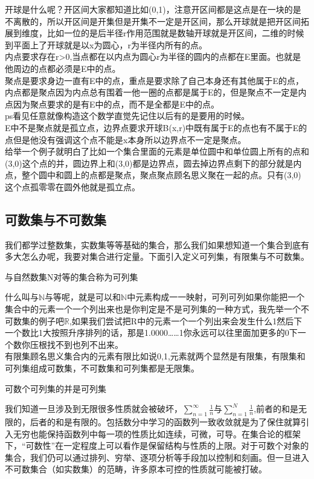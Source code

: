 \documentclass[lang=cn,10pt]{elegantbook}
\begin{document}
\begin{remark}
    开球是什么呢？开区间大家都知道比如(0,1)，注意开区间都是这点是在一块的是不离散的，所以开区间是开集但是开集不一定是开区间，那么开球就是把开区间拓展到维度，比如一位的是后半径r作用范围就是数轴开球就是开区间，二维的时候到平面上了开球就是以x为圆心，r为半径内所有的点。\\内点要求存在r>0,当点都在以内点为圆心r为半径的圆内的点都在E里面。也就是他周边的点都必须是E中的点。\\聚点是要求身边一直有E中的点，重点是要求除了自己本身还有其他属于E的点，内点都是聚点因为内点总有围着一他一圈的点都是属于E的，但是聚点不一定是内点因为聚点要求的是有E中的点，而不是全都是E中的点。\\ps看见任意就像构造这个数学直觉先记住以后有的是要用的时候。\\E中不是聚点就是孤立点，边界点要求开球B(x,r)中既有属于E的点也有不属于E的点但是他没有强调这个点不能是x本身所以边界点不一定是聚点。\\给举一个例子就明白了比如一个集合里面的元素是单位圆中和单位圆上所有的点和(3,0)这个点的并，圆边界上和(3,0)都是边界点，圆去掉边界点剩下的部分就是内点，整个圆中和圆上的点都是聚点，聚点聚点顾名思义聚在一起的点。只有(3,0)这个点孤零零在圆外他就是孤立点。
\end{remark}

\subsection{可数集与不可数集}
我们都学过整数集，实数集等等基础的集合，那么我们如果想知道一个集合到底有多大怎么办呢，我要对集合进行定量。下面引入定义可列集，有限集与不可数集。
\begin{definition}
    与自然数集N对等的集合称为可列集
\end{definition}
什么叫与$\mathbb{N}$与等呢，就是可以和$\mathbb{N}$中元素构成一一映射，可列可列如果你能把一个集合中的元素一个一个列出来也是你判定是不是可列集的一种方式，我先举一个不可数集的例子吧$\mathbb{R}$,如果我们尝试把R中的元素一个一个列出来会发生什么1然后下一个数比1大按照升序排列的话，那是1.0000……1你永远可以往里面加更多的0下一个数你压根找不到也列不出来。\\
有限集顾名思义集合内的元素有限比如说{0,1},元素就两个显然是有限集，有限集和可列集组成可数集，不可数集和可列集都是无限集。
\begin{theorem}
    可数个可列集的并是可列集
\end{theorem}
我们知道一旦涉及到无限很多性质就会被破坏，$\sum_{n=1}^{\infty}\frac{1}{n}$与$
  \sum_{n=1}^{N} \frac{1}{n}$,前者的和是无限的，后者的和是有限的。包括数分中学习的函数列一致收敛就是为了保住就算引入无穷也能保持函数列中每一项的性质比如连续，可微，可导。在集合论的框架下，“可数性”在一定程度上可以看作是保留结构与性质的上限。对于可数个对象的集合，我们仍可以通过排列、穷举、逐项分析等手段加以控制和刻画。但一旦进入不可数集合（如实数集）的范畴，许多原本可控的性质就可能被打破。
\end{document}
